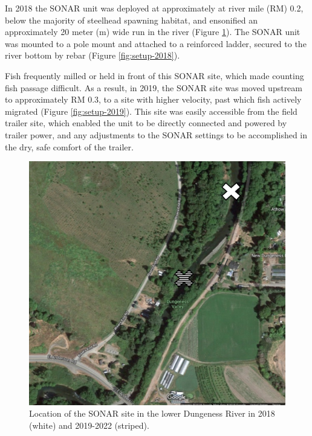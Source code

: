 \documentclass[
]{article}
\begin{document}
In 2018 the SONAR unit was deployed at approximately at river mile (RM) 0.2, below the majority of steelhead spawning habitat, and ensonified an approximately 20 meter (m) wide run in the river (Figure \ref{fig:site-map}). The SONAR unit was mounted to a pole mount and attached to a reinforced ladder, secured to the river bottom by rebar (Figure \ref{fig:setup-2018}).

Fish frequently milled or held in front of this SONAR site, which made counting fish passage difficult. As a result, in 2019, the SONAR site was moved upstream to approximately RM 0.3, to a site with higher velocity, past which fish actively migrated (Figure \ref{fig:setup-2019}). This site was easily accessible from the field trailer site, which enabled the unit to be directly connected and powered by trailer power, and any adjustments to the SONAR settings to be accomplished in the dry, safe comfort of the trailer.

\begin{figure}

{\centering \includegraphics[width=0.7\linewidth]{../images/site_map} 

}

\caption{Location of the SONAR site in the lower Dungeness River in 2018 (white) and 2019-2022 (striped).}\label{fig:site-map}
\end{figure}
\end{document}
